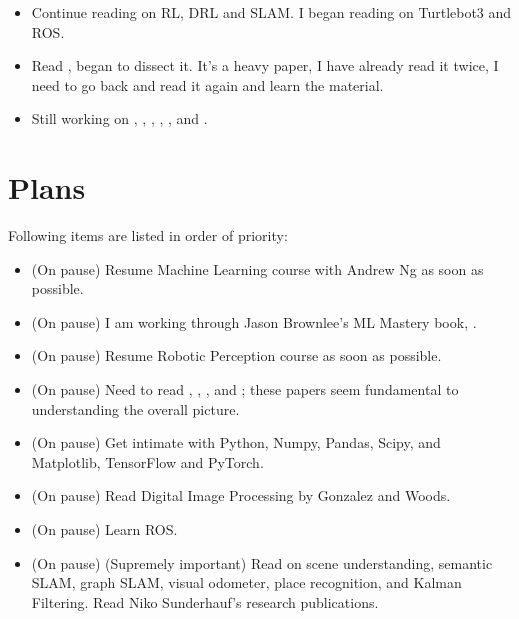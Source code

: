 \documentclass[11pt]{article}
\begin{document}
\begin{itemize}
  \item Continue reading on RL, DRL and SLAM. I began reading on Turtlebot3 and ROS.
  
  \item Read , began to dissect it. It's a heavy paper, I have already read it twice, I need to go back and read it again and learn the material. 
    
    
  \item Still working on \cite{PanopticSeg2019}, \cite{SVO}, \cite{HornsMethod}, \cite{NYUV2}, \cite{DGCNNLPC}, and \cite{MaskRCNN}.

\end{itemize}

\section{Plans}
Following items are listed in order of priority: 

\begin{itemize} 
	
 \item (On pause) Resume Machine Learning course with Andrew Ng as soon as possible.  
 
 \item (On pause) I am working through Jason Brownlee's ML Mastery book, \cite{MLmasteryPy}.
 
 \item (On pause) Resume Robotic Perception course as soon as possible.

 \item (On pause) Need to read \cite{ImSRwDeepCNN}, \cite{MixDNNforSISR}, \cite{mModalSemanticSLAMwProb}, and \cite{RCANforImClass}; these papers seem fundamental to understanding the overall picture.

 \item (On pause) Get intimate with Python, Numpy, Pandas, Scipy, and Matplotlib, TensorFlow and PyTorch. 

 \item (On pause) Read Digital Image Processing by Gonzalez and Woods. 

 \item (On pause) Learn ROS.
 
 \item (On pause) (Supremely important) Read on scene understanding, semantic SLAM, graph SLAM, visual odometer, place recognition, and Kalman Filtering. Read Niko Sunderhauf's research publications. 
 
 \end{itemize}
\end{document}
